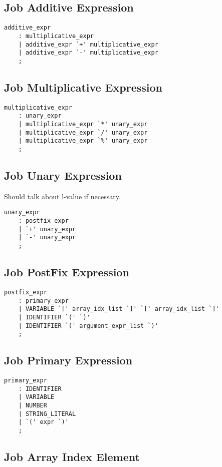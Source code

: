 \documentclass[prodmode,acmtecs]{acmsmall}
\begin{document}
\subsection{Job Additive Expression}

\begin{lstlisting}
additive_expr
	: multiplicative_expr
	| additive_expr `+' multiplicative_expr
	| additive_expr `-' multiplicative_expr
	;
\end{lstlisting}

\subsection{Job Multiplicative Expression}

\begin{lstlisting}
multiplicative_expr
	: unary_expr
	| multiplicative_expr `*' unary_expr
	| multiplicative_expr `/' unary_expr
	| multiplicative_expr `%' unary_expr
	;
\end{lstlisting}

\subsection{Job Unary Expression}
Should talk about l-value if necessary.

\begin{lstlisting}
unary_expr
	: postfix_expr
	| `+' unary_expr
	| `-' unary_expr
	;
\end{lstlisting}

\subsection{Job PostFix Expression}

\begin{lstlisting}
postfix_expr
	: primary_expr
	| VARIABLE `[' array_idx_list `]' `[' array_idx_list `]'
	| IDENTIFIER `(' `)'
	| IDENTIFIER `(' argument_expr_list `)'
	;
\end{lstlisting}

\subsection{Job Primary Expression}

\begin{lstlisting}
primary_expr
	: IDENTIFIER
	| VARIABLE
	| NUMBER
	| STRING_LITERAL
	| `(' expr `)'
	;
\end{lstlisting}

\subsection{Job Array Index Element}
\end{document}
